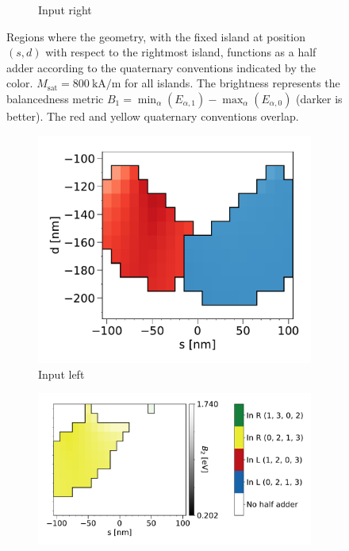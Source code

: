 \documentclass[11pt,a4paper,english]{article}
\begin{document}
\begin{figure}
\begin{subfigure}[t]{0.594\textwidth}
        \caption{Input right}
    \label{fig:HalfAdder_000006_sweep_d-s_balanced1-R}
    \end{subfigure}
    \caption{Regions where the geometry, with the fixed island at position $(s, d)$ with respect to the rightmost island, functions as a half adder according to the quaternary conventions indicated by the color. $M_\mathrm{sat} = \SI{800}{\kilo\ampere\per\metre}$ for all islands. The brightness represents the balancedness metric $B_1 = \min_\alpha(E_{\alpha,1}) - \max_\alpha(E_{\alpha,0})$ (darker is better). The red and yellow quaternary conventions overlap.}
    \label{fig:HalfAdder_000006_sweep_d-s_balanced1}
\end{figure}
\begin{figure}
    \centering
    \begin{subfigure}[t]{0.396\textwidth}
        \includegraphics[width=\textwidth]{Figures/half_adder/sweep/000006_d-s/table(d100-210_10,s-100-100_10)_balanced2.pdf}
        \caption{Input left}
    \label{fig:HalfAdder_000006_sweep_d-s_balanced2-L}
    \end{subfigure}
    \begin{subfigure}[t]{0.594\textwidth}
        \includegraphics[width=\textwidth]{Figures/half_adder/sweep/000006_d-s/table(d100-210_10,s-100-100_10)_balanced2_reversedForeground.pdf}

\end{subfigure}
\end{figure}
\end{document}
